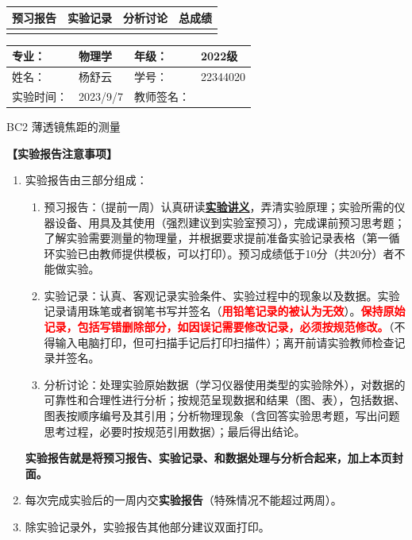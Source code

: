 \documentclass[dvipsnames, svgnames,a4paper,11pt]{article}
\begin{document}
	


	\begin{table}
		\renewcommand\arraystretch{1.7}
		\begin{tabularx}{\textwidth}{
				|X|X|X|X
				|X|X|X|X|}
			\hline
			\multicolumn{2}{|c|}{预习报告}&\multicolumn{2}{|c|}{实验记录}&\multicolumn{2}{|c|}{分析讨论}&\multicolumn{2}{|c|}{总成绩}\\
			\hline
			& & & & & & & \\
			\hline
		\end{tabularx}
	\end{table}
		
	\begin{table}
		\renewcommand\arraystretch{1.7}
		\begin{tabularx}{\textwidth}{|X|X|X|X|}
			\hline
			专业： & 物理学 &年级： & 2022级\\
			\hline
			姓名： & 杨舒云  & 学号： & 22344020\\
			\hline
			实验时间： & 2023/9/7 & 教师签名： & \\
			\hline
		\end{tabularx}
	\end{table}

	\begin{center}
		\LARGE BC2 \quad 薄透镜焦距的测量
	\end{center}
	
	\textbf{【实验报告注意事项】}
	\begin{enumerate}
		\item 实验报告由三部分组成：
		\begin{enumerate}
			\item 预习报告：（提前一周）认真研读\underline{\textbf{实验讲义}}，弄清实验原理；实验所需的仪器设备、用具及其使用（强烈建议到实验室预习），完成课前预习思考题；了解实验需要测量的物理量，并根据要求提前准备实验记录表格（第一循环实验已由教师提供模板，可以打印）。预习成绩低于10分（共20分）者不能做实验。
			\item 实验记录：认真、客观记录实验条件、实验过程中的现象以及数据。实验记录请用珠笔或者钢笔书写并签名（\textcolor{red}{\textbf{用铅笔记录的被认为无效}}）。\textcolor{red}{\textbf{保持原始记录，包括写错删除部分，如因误记需要修改记录，必须按规范修改。}}（不得输入电脑打印，但可扫描手记后打印扫描件）；离开前请实验教师检查记录并签名。
			\item 分析讨论：处理实验原始数据（学习仪器使用类型的实验除外），对数据的可靠性和合理性进行分析；按规范呈现数据和结果（图、表），包括数据、图表按顺序编号及其引用；分析物理现象（含回答实验思考题，写出问题思考过程，必要时按规范引用数据）；最后得出结论。
		\end{enumerate}
		\textbf{实验报告就是将预习报告、实验记录、和数据处理与分析合起来，加上本页封面。}
		\item 每次完成实验后的一周内交\textbf{实验报告}（特殊情况不能超过两周）。
		\item 除实验记录外，实验报告其他部分建议双面打印。
	\end{enumerate}
	
\end{document}
